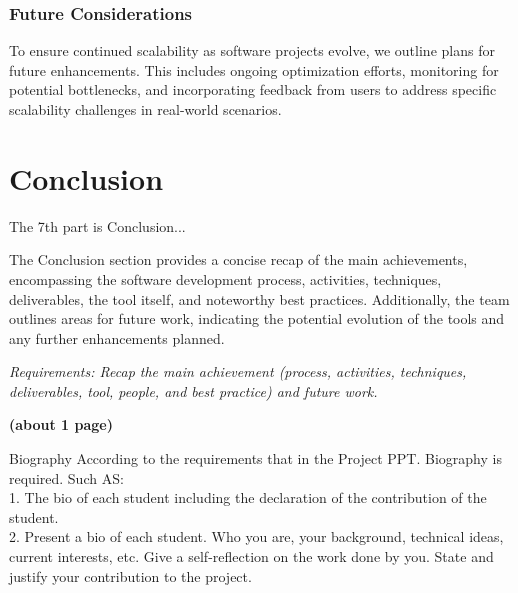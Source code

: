 \documentclass[journal]{IEEEtran}
\begin{document}
\subsubsection{Future Considerations}

To ensure continued scalability as software projects evolve, we outline plans for future enhancements. This includes ongoing optimization efforts, monitoring for potential bottlenecks, and incorporating feedback from users to address specific scalability challenges in real-world scenarios.



\section{Conclusion}
\noindent The 7th part is Conclusion...

The Conclusion section provides a concise recap of the main achievements, encompassing the software development process, activities, techniques, deliverables, the tool itself, and noteworthy best practices. Additionally, the team outlines areas for future work, indicating the potential evolution of the tools and any further enhancements planned.

\textit{Requirements: Recap the main achievement (process, activities, techniques, deliverables, tool, people, and best practice) and future work.}

\textbf{(about 1 page)}


 

\vspace{-5 mm}
\begin{IEEEbiography}{Biography} According to the requirements that in the Project PPT. Biography is required. Such AS:\\
1. The bio of each student including the declaration of the contribution of the student.\\
2. Present a bio of each student. Who you are, your background, technical ideas, current interests, etc. Give a \textcolor{BurntOrange}{self-reflection} on the work done by you. \textcolor{BurntOrange}{State and justify your contribution} to the project.


\end{IEEEbiography}


\end{document}
